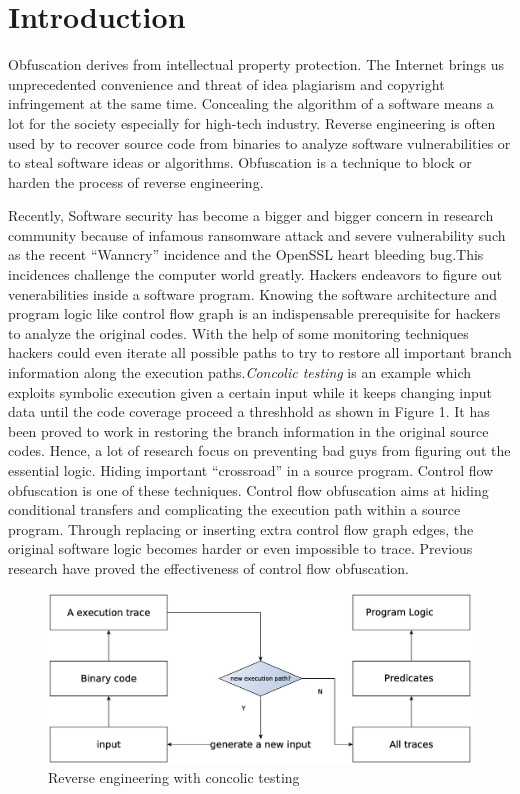 \documentclass[lnicst]{svmultln}
\begin{document}
\section{Introduction}
%
Obfuscation derives from intellectual property protection. The Internet brings us unprecedented convenience and threat of idea plagiarism and copyright infringement at the same time.  Concealing the algorithm of a software means a lot for the society especially for high-tech industry. Reverse engineering is often used by to recover source code from binaries to analyze software vulnerabilities or to steal software ideas or algorithms. Obfuscation is a technique to block or harden the process of reverse engineering.

Recently, Software security has become a bigger and bigger concern in research community because of infamous ransomware attack and severe vulnerability such as the recent ``Wanncry'' incidence and the OpenSSL heart bleeding bug.This incidences challenge the computer world greatly. Hackers endeavors to figure out venerabilities inside a software program. Knowing the software architecture and program logic like control flow graph is an indispensable prerequisite for hackers to analyze the original codes. With the help of some monitoring techniques hackers could even iterate all possible paths to try to restore all important branch information along the execution paths.\textit{Concolic testing} is an example which exploits symbolic execution given a certain input while it keeps changing input data until the code coverage proceed a threshhold\cite{Sen} as shown in Figure 1. It has been proved to work in restoring the branch information in the original source codes. Hence, a lot of research focus on preventing bad guys from figuring out the essential logic. Hiding important ``crossroad'' in a source program. Control flow obfuscation is one of these techniques. Control flow obfuscation aims at hiding conditional transfers and complicating the execution path within a source program. Through replacing or inserting extra control flow graph edges, the original software logic becomes harder or even impossible to trace. Previous research\cite{Ma} have proved the effectiveness of control flow obfuscation.

\begin{figure}
  \includegraphics[width=0.9\linewidth]{reverse_engineering.eps}
  \caption{Reverse engineering with concolic testing}
  \label{Figure 1}
\end{figure}
\end{document}
